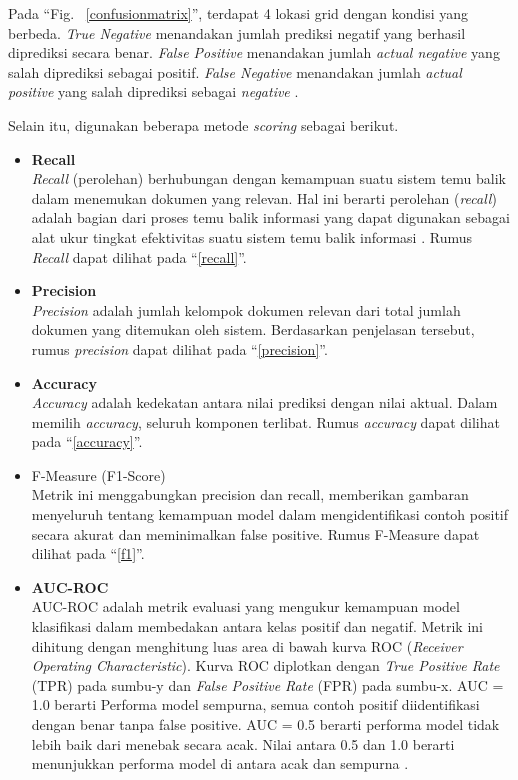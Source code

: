 \documentclass[conference]{IEEEtran}
\begin{document}
Pada ``Fig. ~\ref{confusionmatrix}'', terdapat 4 lokasi grid dengan kondisi yang berbeda. \textit{True Negative} menandakan jumlah prediksi 
negatif yang berhasil diprediksi secara benar. \textit{False Positive} menandakan jumlah \textit{actual negative} yang salah diprediksi sebagai positif. 
\textit{False Negative} menandakan jumlah \textit{actual positive} yang salah diprediksi sebagai \textit{negative} \cite{b47}.

Selain itu, digunakan beberapa metode \textit{scoring} sebagai berikut.

\begin{itemize}
    \item \textbf{Recall} \\
    \textit{Recall} (perolehan) berhubungan dengan kemampuan suatu sistem temu balik dalam menemukan dokumen yang relevan. 
    Hal ini berarti perolehan (\textit{recall}) adalah bagian dari proses temu balik informasi yang dapat digunakan sebagai alat ukur tingkat efektivitas suatu sistem temu balik informasi \cite{b48}. 
    Rumus \textit{Recall} dapat dilihat pada ``\eqref{recall}''. 
    \item \textbf{Precision} \\
    \textit{Precision} adalah jumlah kelompok dokumen relevan dari total jumlah dokumen yang ditemukan oleh sistem. 
    Berdasarkan penjelasan tersebut, rumus \textit{precision} dapat dilihat pada ``\eqref{precision}''.
    \item \textbf{Accuracy} \\
    \textit{Accuracy} adalah kedekatan antara nilai prediksi dengan nilai aktual. Dalam memilih \textit{accuracy}, 
    seluruh komponen terlibat. Rumus \textit{accuracy} dapat dilihat pada ``\eqref{accuracy}''.
    \item F-Measure (F1-Score) \\
    Metrik ini menggabungkan precision dan recall, memberikan gambaran menyeluruh tentang kemampuan model dalam 
    mengidentifikasi contoh positif secara akurat dan meminimalkan false positive. Rumus F-Measure dapat dilihat 
    pada ``\eqref{f1}''.
    \item \textbf{AUC-ROC} \\
    AUC-ROC adalah metrik evaluasi yang mengukur kemampuan model klasifikasi dalam membedakan antara kelas positif dan negatif. Metrik ini dihitung dengan 
    menghitung luas area di bawah kurva ROC (\textit{Receiver Operating Characteristic}). Kurva ROC diplotkan dengan \textit{True Positive Rate} (TPR) pada sumbu-y dan 
    \textit{False Positive Rate} (FPR) pada sumbu-x. AUC = 1.0 berarti Performa model sempurna, semua contoh positif diidentifikasi dengan benar tanpa false positive. 
    AUC = 0.5 berarti performa model tidak lebih baik dari menebak secara acak. Nilai antara 0.5 dan 1.0 berarti menunjukkan performa model di antara acak dan sempurna \cite{b48}.
    

\end{itemize}
\end{document}
